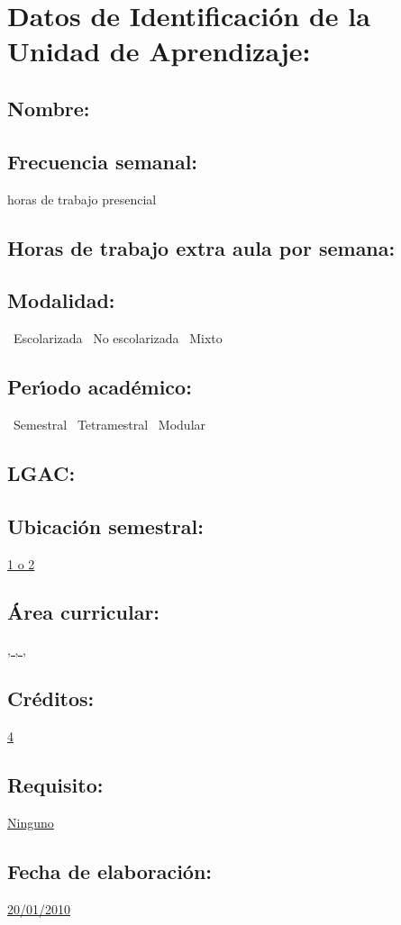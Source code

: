\documentclass[10 pt]{article}
\begin{document}


\section{Datos de Identificaci\'{o}n de la Unidad de Aprendizaje:}
\subsection{Nombre:} 
\subsection{Frecuencia semanal:} horas de trabajo presencial 
\subsection{Horas de trabajo extra aula por semana:} 
\subsection{Modalidad:} \yes~Escolarizada \no~No escolarizada \no~Mixto
\subsection{Per\'{\i}odo acad\'{e}mico:} \yes~Semestral
\no~Tetramestral \no~Modular
\subsection{LGAC:} \underline{\seys}
\subsection{Ubicaci\'{o}n semestral:} \underline{1 o 2}
\subsection{\'{A}rea curricular:} \underline{\fb, \fa, \da, \le \inv}
\subsection{Cr\'{e}ditos:} \underline{4}
\subsection{Requisito:} \underline{Ninguno}
\subsection{Fecha de elaboraci\'{o}n:} \underline{20/01/2010}
\end{document}
